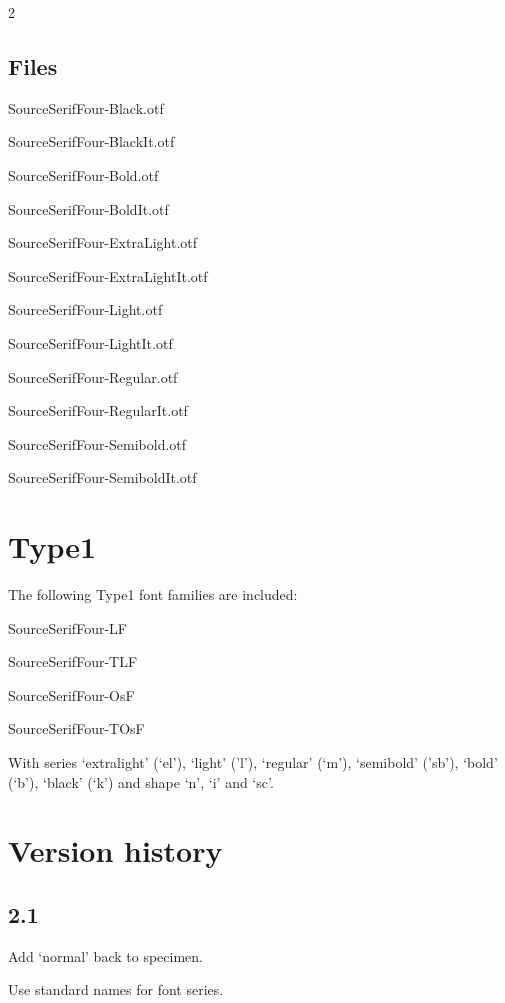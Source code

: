 \documentclass[10pt,a4paper,english]{article}
\begin{document}
\begin{multicols}{2}
\subsection{Files}
\begin{itemize*}
	\item SourceSerifFour-Black.otf
	\item SourceSerifFour-BlackIt.otf
	\item SourceSerifFour-Bold.otf
	\item SourceSerifFour-BoldIt.otf
	\item SourceSerifFour-ExtraLight.otf
	\item SourceSerifFour-ExtraLightIt.otf
	\item SourceSerifFour-Light.otf
	\item SourceSerifFour-LightIt.otf
	\item SourceSerifFour-Regular.otf
	\item SourceSerifFour-RegularIt.otf
	\item SourceSerifFour-Semibold.otf
	\item SourceSerifFour-SemiboldIt.otf
\end{itemize*}

\section{Type1}
The following Type1 font families are included:
\begin{itemize*}
	\item SourceSerifFour-LF
	\item SourceSerifFour-TLF
	\item SourceSerifFour-OsF
	\item SourceSerifFour-TOsF
\end{itemize*}

With series ‘extralight’ (‘el’), ‘light’ (’l’), ‘regular’ (‘m’), ‘semibold’ (’sb’), ‘bold’ (‘b’), ‘black’ (‘k’) and shape ‘n’, ‘i’ and ‘sc’.

\section{Version history}

\subsection*{2.1}
\begin{itemize*}
	\item Add ‘normal’ back to specimen.
	\item Use standard names for font series.
\end{itemize*}


\end{multicols}
\end{document}
